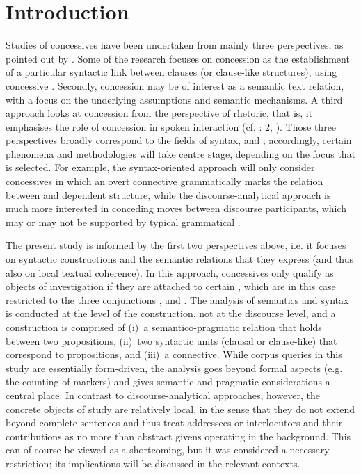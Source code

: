 \chapter{\label{bkm:Ref411411802}Introduction}\label{sec:1}

Studies of concessives have been undertaken from mainly three perspectives, as pointed out by \citet[382–383]{Couper-KuhlenThompson2000}. Some of the research focuses on concession as the establishment of a particular syntactic link between clauses (or clause-like structures), using concessive . Secondly, concession may be of interest as a semantic text relation, with a focus on the underlying assumptions and semantic mechanisms. A third approach looks at concession from the perspective of rhetoric, that is, it emphasises the role of concession in spoken interaction (cf. \citealt{Couper-KuhlenKortmann2000Introduction}: 2, \citealt{Barth2000,Barth-Weingarten2003}). Those three perspectives broadly correspond to the fields of syntax,  and ; accordingly, certain phenomena and methodologies will take centre stage, depending on the focus that is selected. For example, the syntax-oriented approach will only consider concessives in which an overt connective grammatically marks the relation between  and dependent structure, while the discourse-analytical approach is much more interested in conceding moves between discourse participants, which may or may not be supported by typical grammatical .

  The present study is informed by the first two perspectives above, i.e. it focuses on syntactic constructions and the semantic relations that they express (and thus also on local textual coherence). In this approach, concessives only qualify as objects of investigation if they are attached to certain , which are in this case restricted to the three conjunctions ,  and . The analysis of semantics and syntax is conducted at the level of the construction, not at the discourse level, and a construction is comprised of
(i)~a semantico-pragmatic relation that holds between two propositions,
(ii)~two syntactic units (clausal or clause-like) that correspond to propositions, and
(iii)~a connective. While corpus queries in this study are essentially form-driven, the analysis goes beyond formal aspects (e.g. the counting of markers) and gives semantic and pragmatic considerations a central place. In contrast to discourse-analytical approaches, however, the concrete objects of study are relatively local, in the sense that they do not extend beyond complete sentences and thus treat addressees or interlocutors and their contributions as no more than abstract givens operating in the background. This can of course be viewed as a shortcoming, but it was considered a necessary restriction; its implications will be discussed in the relevant contexts.


